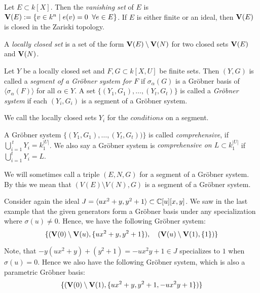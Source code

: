 \begin{definition}
  Let $E \subset k[X]$. Then the \textit{vanishing set} of $E$ is $\operatorname{\mathbf V}(E) := \{v \in k^{n} \mid e(v) = 0 \;\; \forall e \in E\}$. If $E$ is either finite or an ideal, then $\operatorname{\mathbf V}(E)$ is closed in the Zariski topology.

  A \textit{locally closed set} is a set of the form $\operatorname{\mathbf V}(E) \setminus \operatorname{\mathbf V}(N)$ for two closed sets $\operatorname{\mathbf V}(E)$ and $\operatorname{\mathbf V}(N)$.
\end{definition}

\begin{definition}
  Let $Y$ be a locally closed set and $F, G \subset k[X, U]$ be finite sets. Then $(Y, G)$ is called a \textit{segment of a Gröbner system for $F$} if $\sigma_{\alpha}(G)$ is a Gröbner basis of $\langle \sigma_{\alpha}(F) \rangle$ for all $\alpha \in Y$. A set $\{(Y_{1}, G_{1}), \dots, (Y_{t}, G_{t})\}$ is called a \textit{Gröbner system} if each $(Y_{i}, G_{i})$ is a segment of a Gröbner system.

  We call the locally closed sets $Y_{i}$ for the $\textit{conditions}$ on a segment.

  A Gröbner system $\{(Y_{1}, G_{1}), \dots, (Y_{t}, G_{t}))\}$ is called \textit{comprehensive}, if $\bigcup_{i=1}^{\,t}Y_{i} = k_{1}^{|U|}$. We also say a Gröbner system is \textit{comprehensive on $L \subset k_{1}^{|U|}$} if $\bigcup_{i=1}^{t}Y_{i} = L$.
\end{definition}

We will sometimes call a triple $(E, N, G)$ for a segment of a Gröbner system. By this we mean that $(V(E) \setminus V(N), G)$ is a segment of a Gröbner system.

\begin{example}\upshape
  Consider again the ideal $J = \langle ux^{2} + y, y^{2} + 1 \rangle \subset \mathbb{C}[u][x, y]$. We saw in the last example that the given generators form a Gröbner basis under any specialization where $\sigma(u) \neq 0$. Hence, we have the following Gröbner system:
  \[\{(\operatorname{\mathbf V}(0) \setminus \operatorname{\mathbf V}(u), \{ux^{2} + y, y^{2} + 1\}), \quad (\operatorname{\mathbf V}(u) \setminus \operatorname{\mathbf V}(1), \{1\})\}\]

  Note, that $-y(ux^{2} + y) + (y^{2} + 1) = -ux^{2}y + 1 \in J$ specializes to $1$ when $\sigma(u) = 0$. Hence we also have the following Gröbner system, which is also a parametric Gröbner basis:
  \[\{(\operatorname{\mathbf V}(0) \setminus \operatorname{\mathbf V}(1), \{ux^{2} + y, y^{2} + 1, -ux^{2}y + 1\})\}\]
\end{example}

